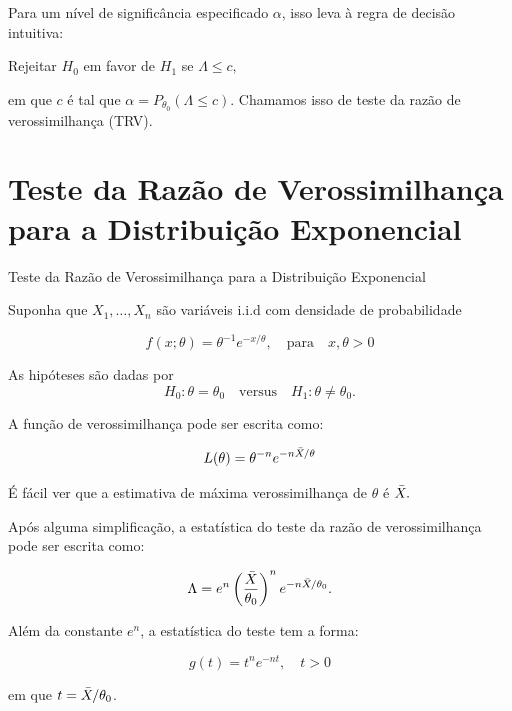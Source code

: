 \documentclass[12pt]{beamer}
\begin{document}
\begin{frame}{}
\begin{block}{}
\justifying
Para um nível de significância especificado $\alpha$, isso leva à regra de decisão intuitiva:

\begin{center}
Rejeitar $H_0$ em favor de $H_1$ se $\Lambda \leq c,$
\end{center}

em que $c$ é tal que $\alpha = P_{\theta_0}(\Lambda \leq c)$. Chamamos isso de teste da razão de verossimilhança (TRV).
\end{block}
\end{frame}

\section{Teste da Razão de Verossimilhança para a Distribuição Exponencial}
\begin{frame}{Teste da Razão de Verossimilhança para a Distribuição Exponencial}
\begin{block}{}
\justifying
Suponha que $X_1, \ldots, X_n$ são variáveis i.i.d com densidade de probabilidade

\[
f(x; \theta) = \theta^{-1} e^{-x/\theta}, \quad \text{para} \quad x, \theta > 0
\]

As hipóteses são dadas por 
\[
H_0: \theta = \theta_0 \quad \text{versus} \quad H_1: \theta \neq \theta_0.
\]

A função de verossimilhança pode ser escrita como:

\[
L(\theta) = \theta^{-n} e^{-n\Bar{X}/\theta}
\]

É fácil ver que a estimativa de máxima verossimilhança de $\theta$ é $\Bar{X}.$
\end{block}
\end{frame}

\begin{frame}{}
\begin{block}{}
\justifying
Após alguma simplificação, a estatística do teste da razão de verossimilhança pode ser escrita como:

\[
\Lambda = e^n\left(\dfrac{\Bar{X}}{\theta_0}\right)^{n}e^{-n\Bar{X}/\theta_{0}}.
\]

Além da constante $e^n$, a estatística do teste tem a forma:

\[
g(t) = t^n e^{-nt}, \quad t > 0
\]

em que $t = \Bar{X}/\theta_0$.
\end{block}
\end{frame}
\end{document}
